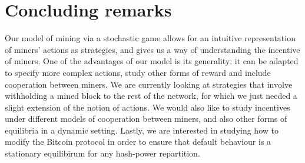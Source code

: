 \section{Concluding remarks}
\label{sec-con-r}

Our model of mining via a stochastic game allows for an intuitive representation of miners' actions as strategies, 
and gives us a way of understanding the incentive of miners. 
One of the advantages of our model is its generality: it can be adapted to specify more complex 
actions, study other forms of reward and include cooperation between miners. 
We are currently looking at strategies that involve withholding 
a mined block to the rest of the network, for which we just needed a slight extension of the notion of actions. 
We would also like to study incentives under different models of cooperation between miners, and 
also other forms of equilibria in a dynamic setting. 
Lastly, we are interested in studying how to modify the Bitcoin protocol in order to ensure that default behaviour is a 
stationary equilibirum for any hash-power repartition. 
